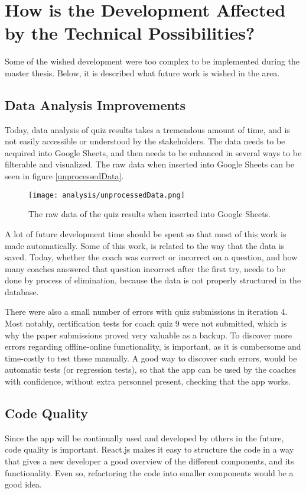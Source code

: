 \section{How is the Development Affected by the Technical Possibilities?}\label{rq1}

Some of the wished development were too complex to be implemented during the master thesis. Below, it is described what future work is wished in the area.

\subsection{Data Analysis Improvements}
Today, data analysis of quiz results takes a tremendous amount of time, and is not easily accessible or understood by the stakeholders. The data needs to be acquired into Google Sheets, and then needs to be enhanced in several ways to be filterable and visualized. The raw data when inserted into Google Sheets can be seen in figure \ref{unprocessedData}.

\begin{figure}[h]
  \centering
  \texttt{[image: analysis/unprocessedData.png]}
  \caption{The raw data of the quiz results when inserted into Google Sheets.}
  \label{fig:unprocessedData}
\end{figure}

A lot of future development time should be spent so that most of this work is made automatically. Some of this work, is related to the way that the data is saved. Today, whether the coach was correct or incorrect on a question, and how many coaches answered that question incorrect after the first try, needs to be done by process of elimination, because the data is not properly structured in the database.

There were also a small number of errors with quiz submissions in iteration 4. Most notably, certification tests for coach quiz 9 were not submitted, which is why the paper submissions proved very valuable as a backup. To discover more errors regarding offline-online functionality, is important, as it is cumbersome and time-costly to test these manually. A good way to discover such errors, would be automatic tests (or regression tests), so that the app can be used by the coaches with confidence, without extra personnel present, checking that the app works.

\subsection{Code Quality}
Since the app will be continually used and developed by others in the future, code quality is important. React.js makes it easy to structure the code in a way that gives a new developer a good overview of the different components, and its functionality. Even so, refactoring the code into smaller components would be a good idea.

